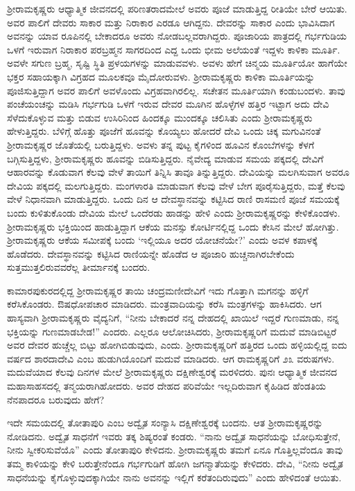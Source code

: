 ಶ‍್ರೀರಾಮಕೃಷ್ಣರು ಆಧ್ಯಾತ್ಮಿಕ ಜೀವನದಲ್ಲಿ ಪರಿಣತರಾದಮೇಲೆ ಅವರು ಪೂಜೆ ಮಾಡುತ್ತಿದ್ದ ರೀತಿಯೇ ಬೇರೆ ಆಯಿತು. ಅವರ ಪಾಲಿಗೆ ದೇವರು ಸಾಕಾರ ಮತ್ತು ನಿರಾಕಾರ ಎರಡೂ ಆಗಿದ್ದನು. ದೇವರನ್ನು ಸಾಕಾರ ಎಂದು ಭಾವಿಸಿದಾಗ ಅವನನ್ನು ಯಾವ ರೂಪಿನಲ್ಲಿ ಬೇಕಾದರೂ ಅವರು ನೋಡಬಲ್ಲವರಾಗಿದ್ದರು. ಪೂಜಾರಿಯ ಪಾತ್ರದಲ್ಲಿ ಗರ್ಭಗುಡಿಯ ಒಳಗೆ ಇರುವಾಗ ನಿರಾಕಾರ ಪರಬ್ರಹ್ಮನ ಸಾಗರದಿಂದ ಎದ್ದ ಒಂದು ಭೀಮ ಅಲೆಯಂತೆ ಇದ್ದಳು ಕಾಳಿಕಾ ಮೂರ್ತಿ. ಅವಳೇ ಸಗುಣ ಬ್ರಹ್ಮ, ಸೃಷ್ಟಿ ಸ್ಥಿತಿ ಪ್ರಳಯಗಳನ್ನು ಮಾಡುವವಳು. ಅವಳು ಹೇಗೆ ಚಿನ್ಮಯ ಮೂರ್ತಿಯೋ ಹಾಗೆಯೇ ಭಕ್ತರ ಸಹಾಯಕ್ಕಾಗಿ ವಿಗ್ರಹದ ಮೂಲಕವೂ ಮೈದೋರುವಳು. ಶ‍್ರೀರಾಮಕೃಷ್ಣರು ಕಾಳಿಕಾ ಮೂರ್ತಿಯನ್ನು ಪೂಜಿಸುತ್ತಿದ್ದಾಗ ಅವರ ಪಾಲಿಗೆ ಅವಳೊಂದು ವಿಗ್ರಹವಾಗಿರಲಿಲ್ಲ. ಸಚೇತನ ಮೂರ್ತಿಯಾಗಿ ಕಂಡುಬಂದಳು. ತಾವು ಪಂಚೆಯಂಚನ್ನು ಮಡಿಸಿ ಗರ್ಭಗುಡಿ ಒಳಗೆ ಇರುವ ದೇವರ ಮೂಗಿನ ಹೊಳ್ಳೆಗಳ ಹತ್ತಿರ ಇಟ್ಟಾಗ ಅದು ದೇವಿ ಸೆಳೆದುಕೊಳ್ಳುವ ಮತ್ತು ಬಿಡುವ ಉಸಿರಿನಿಂದ ಹಿಂದಕ್ಕೂ ಮುಂದಕ್ಕೂ ಚಲಿಸಿತು ಎಂದು ಶ‍್ರೀರಾಮಕೃಷ್ಣರು ಹೇಳುತ್ತಿದ್ದರು. ಬೆಳಿಗ್ಗೆ ಹೊತ್ತು ಪೂಜೆಗೆ ಹೂವನ್ನು ಕೊಯ್ಯಲು ಹೋದರೆ ದೇವಿ ಒಂದು ಚಿಕ್ಕ ಮಗುವಿನಂತೆ ಶ‍್ರೀರಾಮಕೃಷ್ಣರ ಜೊತೆಯಲ್ಲಿ ಬರುತ್ತಿದ್ದಳು. ಅವಳು ತನ್ನ ಪುಟ್ಟ ಕೈಗಳಿಂದ ಹೂವಿನ ಕೊಂಬೆಗಳನ್ನು ಕೆಳಗೆ ಬಗ್ಗಿಸುತ್ತಿದ್ದಳು, ಶ‍್ರೀರಾಮಕೃಷ್ಣರು ಹೂವನ್ನು ಬಿಡಿಸುತ್ತಿದ್ದರು. ನೈವೇದ್ಯ ಮಾಡುವ ಸಮಯ ಪಕ್ಕದಲ್ಲಿ ದೇವಿಗೆ ಆಹಾರವನ್ನು ಕೊಡುವಾಗ ಕೆಲವು ವೇಳೆ ತಾಯಿಗೆ ತಿನ್ನಿಸಿ ತಾವೂ ತಿನ್ನುತ್ತಿದ್ದರು. ದೇವಿಯನ್ನು ಮಲಗಿಸುವಾಗ ಅವರೂ ದೇವಿಯ ಪಕ್ಕದಲ್ಲಿ ಮಲಗುತ್ತಿದ್ದರು. ಮಂಗಳಾರತಿ ಮಾಡುವಾಗ ಕೆಲವು ವೇಳೆ ಬೇಗ ಪೂರೈಸುತ್ತಿದ್ದರು, ಮತ್ತೆ ಕೆಲವು ವೇಳೆ ನಿಧಾನವಾಗಿ ಮಾಡುತ್ತಿದ್ದರು. ಒಂದು ದಿನ ಆ ದೇವಸ್ಥಾನವನ್ನು ಕಟ್ಟಿಸಿದ ರಾಣಿ ರಾಸಮಣಿ ಪೂಜೆ ಸಮಯಕ್ಕೆ ಬಂದು ಕುಳಿತುಕೊಂಡು ದೇವಿಯ ಮೇಲೆ ಒಂದೆರಡು ಹಾಡನ್ನು ಹೇಳಿ ಎಂದು ಶ‍್ರೀರಾಮಕೃಷ್ಣರನ್ನು ಕೇಳಿಕೊಂಡಳು. ಶ‍್ರೀರಾಮಕೃಷ್ಣರು ಭಕ್ತಿಯಿಂದ ಹಾಡುತ್ತಿದ್ದಾಗ ಆಕೆಯ ಮನಸ್ಸು ಕೋರ್ಟಿನಲ್ಲಿದ್ದ ಒಂದು ಕೇಸಿನ ಮೇಲೆ ಹೋಗಿತ್ತು. ಶ‍್ರೀರಾಮಕೃಷ್ಣರು ಆಕೆಯ ಸಮೀಪಕ್ಕೆ ಬಂದು ‘ಇಲ್ಲಿಯೂ ಅದರ ಯೋಚನೆಯೇ?’ ಎಂದು ಅವಳ ಕಪಾಳಕ್ಕೆ ಹೊಡೆದರು. ದೇವಸ್ಥಾನವನ್ನು ಕಟ್ಟಿಸಿದ ರಾಣಿಯನ್ನೇ ಹೊಡೆದ ಆ ಪೂಜಾರಿ ಹುಚ್ಚನಾಗಿರಬೇಕೆಂದು ಸುತ್ತಮುತ್ತಲಿರುವವರೆಲ್ಲ ತೀರ್ಮಾನಕ್ಕೆ ಬಂದರು.

ಕಾಮಾರಪುಕುರದಲ್ಲಿದ್ದ ಶ‍್ರೀರಾಮಕೃಷ್ಣರ ತಾಯಿ ಚಂದ್ರಮಣೀದೇವಿಗೆ ಇದು ಗೊತ್ತಾಗಿ ಮಗನನ್ನು ಹಳ್ಳಿಗೆ ಕರೆಸಿಕೊಂಡರು. ಔಷಧೋಪಚಾರ ಮಾಡಿದರು. ಮಂತ್ರವಾದಿಯನ್ನು ಕರೆಸಿ ಮಂತ್ರಗಳನ್ನು ಹಾಕಿಸಿದರು. ಆಗ ಹಾಸ್ಯವಾಗಿ ಶ‍್ರೀರಾಮಕೃಷ್ಣರು ವೈದ್ಯನಿಗೆ, “ನೀನು ಬೇಕಾದರೆ ನನ್ನ ದೇಹದಲ್ಲಿ ಖಾಯಿಲೆ ಇದ್ದರೆ ಗುಣಮಾಡು, ನನ್ನ ಭಕ್ತಿಯನ್ನು ಗುಣಮಾಡಬೇಡ!” ಎಂದರು. ಎಲ್ಲರೂ ಆಲೋಚಿಸಿದರು, ಶ‍್ರೀರಾಮಕೃಷ್ಣರಿಗೆ ಮದುವೆ ಮಾಡಿಬಿಟ್ಟರೆ ಅವರ ದೇವರ ಹುಚ್ಚೆಲ್ಲ ಬಿಟ್ಟು ಹೋಗಿಬಿಡುವುದು, ಎಂದು. ಶ‍್ರೀರಾಮಕೃಷ್ಣರಿಗೆ ಹತ್ತಿರದ ಒಂದು ಹಳ್ಳಿಯಲ್ಲಿದ್ದ ಐದು ವರ್ಷದ ಶಾರದಾದೇವಿ ಎಂಬ ಹುಡುಗಿಯೊಂದಿಗೆ ಮದುವೆ ಮಾಡಿದರು. ಆಗ ರಾಮಕೃಷ್ಣರಿಗೆ ೨೩ ವರುಷಗಳು. ಮದುವೆಯಾದ ಕೆಲವು ದಿನಗಳ ಮೇಲೆ ಶ‍್ರೀರಾಮಕೃಷ್ಣರು ದಕ್ಷಿಣೇಶ್ವರಕ್ಕೆ ಮರಳಿದರು. ಪುನಃ ಆಧ್ಯಾತ್ಮಿಕ ಜೀವನದ ಮಹಾಸಾಹಸದಲ್ಲಿ ತನ್ಮಯರಾಗಿಹೋದರು. ಅವರ ದೇಹದ ಪರಿವೆಯೇ ಇಲ್ಲದಿರುವಾಗ ಕೈಹಿಡಿದ ಹೆಂಡತಿಯ ನೆನಪಾದರೂ ಬರುವುದು ಹೇಗೆ?

\newpage

ಇದೇ ಸಮಯದಲ್ಲಿ ತೋತಾಪುರಿ ಎಂಬ ಅದ್ವೈತ ಸಂನ್ಯಾಸಿ ದಕ್ಷಿಣೇಶ್ವರಕ್ಕೆ ಬಂದನು. ಆತ ಶ‍್ರೀರಾಮಕೃಷ್ಣರನ್ನು ನೋಡಿದನು. ಅದ್ವೈತ ಸಾಧನೆಗೆ ಇವರು ತಕ್ಕ ಶಿಷ್ಯರಂತೆ ಕಂಡರು. “ನಾನು ಅದ್ವೈತ ಸಾಧನೆಯನ್ನು ಬೋಧಿಸುತ್ತೇನೆ, ನೀನು ಸ್ವೀಕರಿಸುವೆಯೊ” ಎಂದು ತೋತಾಪುರಿ ಕೇಳಿದನು. ಶ‍್ರೀರಾಮಕೃಷ್ಣರು ತಮಗೆ ಏನೂ ಗೊತ್ತಿಲ್ಲವೆಂದೂ ತಾವು ತಮ್ಮ ಕಾಳಿಯನ್ನು ಕೇಳಿ ಬರುತ್ತೇನೆಂದೂ ಗರ್ಭಗುಡಿಗೆ ಹೋಗಿ ಜಗನ್ಮಾತೆಯನ್ನು ಕೇಳಿದರು. ದೇವಿ, “ನೀನು ಅದ್ವೈತ ಸಾಧನೆಯನ್ನು ಕೈಗೊಳ್ಳುವುದಕ್ಕಾಗಿಯೇ ನಾನು ಅವನನ್ನು ಇಲ್ಲಿಗೆ ಕರೆತಂದಿರುವುದು” ಎಂದು ಹೇಳಿದಂತೆ ಆಯಿತು.


